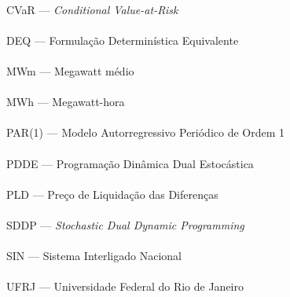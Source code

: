\paragraph{}CVaR --- \textit{Conditional Value-at-Risk}
\paragraph{}DEQ --- Formula\c{c}\~ao Determin\'istica Equivalente
\paragraph{}MWm --- Megawatt m\'edio
\paragraph{}MWh --- Megawatt-hora
\paragraph{}PAR(1) --- Modelo Autorregressivo Peri\'odico de Ordem 1
\paragraph{}PDDE --- Programa\c{c}\~ao Din\^amica Dual Estoc\'astica
\paragraph{}PLD --- Pre\c{c}o de Liquida\c{c}\~ao das Diferen\c{c}as
\paragraph{}SDDP --- \textit{Stochastic Dual Dynamic Programming}
\paragraph{}SIN --- Sistema Interligado Nacional
\paragraph{}UFRJ --- Universidade Federal do Rio de Janeiro

\pagebreak
